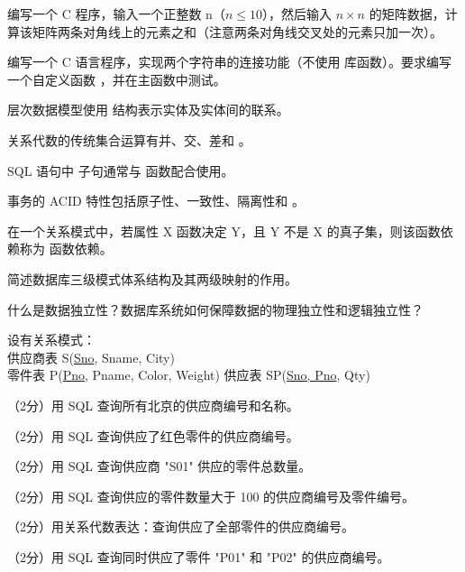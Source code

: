 \documentclass[a4paper,11pt]{article}
\begin{document}

\pq 编写一个 C 程序，输入一个正整数 n（$n \le 10$），然后输入 $n \times n$ 的矩阵数据，计算该矩阵两条对角线上的元素之和（注意两条对角线交叉处的元素只加一次）。
\anslines{6cm}

\pq 编写一个 C 语言程序，实现两个字符串的连接功能（不使用  库函数）。要求编写一个自定义函数 ，并在主函数中测试。
\anslines{6cm}



\q 层次数据模型使用 \fillblank 结构表示实体及实体间的联系。

\q 关系代数的传统集合运算有并、交、差和 \fillblank 。

\q SQL 语句中  子句通常与 \fillblank 函数配合使用。

\q 事务的 ACID 特性包括原子性、一致性、隔离性和 \fillblank 。

\q 在一个关系模式中，若属性 X 函数决定 Y，且 Y 不是 X 的真子集，则该函数依赖称为 \fillblank 函数依赖。


\q 简述数据库三级模式体系结构及其两级映射的作用。
\anslines{3cm}

\q 什么是数据独立性？数据库系统如何保障数据的物理独立性和逻辑独立性？
\anslines{3cm}


设有关系模式：\\
供应商表 S(\underline{Sno}, Sname, City)\\
零件表 P(\underline{Pno}, Pname, Color, Weight)
供应表 SP(\underline{Sno, Pno}, Qty)

\q （2分）用 SQL 查询所有北京的供应商编号和名称。
\anslines{0.8cm}

\q （2分）用 SQL 查询供应了红色零件的供应商编号。
\anslines{0.8cm}

\q （2分）用 SQL 查询供应商 "S01" 供应的零件总数量。
\anslines{0.8cm}

\q （2分）用 SQL 查询供应的零件数量大于 100 的供应商编号及零件编号。
\anslines{0.8cm}

\q （2分）用关系代数表达：查询供应了全部零件的供应商编号。
\anslines{1.2cm}

\q （2分）用 SQL 查询同时供应了零件 "P01" 和 "P02" 的供应商编号。
\anslines{1cm}
\end{document}

